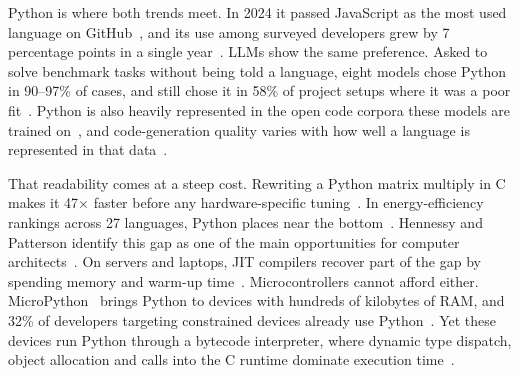 Python is where both trends meet. In 2024 it passed JavaScript as the
most used language on GitHub~\cite{octoverse2024}, and its use among
surveyed developers grew by 7 percentage points in a single
year~\cite{stackoverflow2025}. LLMs show the same preference. Asked to
solve benchmark tasks without being told a language, eight models
chose Python in 90--97\% of cases, and still chose it in 58\% of project
setups where it was a poor fit~\cite{twist2025}. Python is
also heavily represented in the open code corpora these models are
trained on~\cite{kocetkov2023}, and code-generation quality varies
with how well a language is represented in that data~\cite{cassano2023}.

That readability comes at a steep cost. Rewriting a Python matrix
multiply in C makes it 47$\times$ faster before any hardware-specific
tuning~\cite{leiserson2020}. In energy-efficiency rankings across 27
languages, Python places near the bottom~\cite{pereira2021}. Hennessy and
Patterson identify this gap as one of the main opportunities for
computer architects~\cite{hennessy2019}. On servers and laptops, JIT
compilers recover part of the gap by spending memory and warm-up
time~\cite{bolz2009pypy,pep744}. Microcontrollers cannot afford either.
MicroPython~\cite{micropython} brings Python to devices with hundreds of
kilobytes of RAM, and 32\% of developers targeting constrained devices
already use Python~\cite{eclipse2024}. Yet these devices run Python
through a bytecode interpreter, where dynamic type dispatch, object
allocation and calls into the C runtime dominate execution
time~\cite{ismail2018}.

